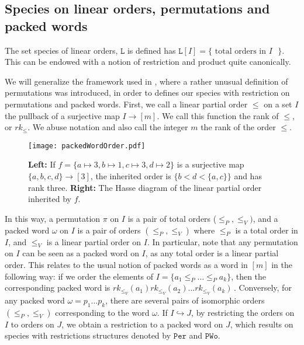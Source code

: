 \documentclass[submission]{FPSAC2023}
\theoremstyle{definition}
\begin{document}
\subsection{Species on linear orders, permutations and packed words\label{sec:speciespermutation}}

The set species of linear orders, $\mathtt{L}$ is defined has $\mathtt{L}[I] = \{\text{ total orders in $I$ }\}$.
This can be endowed with a notion of restriction and product quite canonically.

We will generalize the framework used in \cite{albert2020two}, where a rather unusual definition of permutations was introduced, in order to defines our species with restriction on permutations and packed words.  
First, we call a linear partial order $\leq$ on a set $I$ the pullback of a surjective map $I \to [m]$.
We call this function the rank of $\leq$, or $rk_{\leq}$.
We abuse notation and also call the integer $m$ the rank of the order $\leq$.

\begin{figure}[h]
	\centering
	\texttt{[image: packedWordOrder.pdf]}
	\caption{\textbf{Left:} If $f = \{ a\mapsto 3, b\mapsto 1, c\mapsto 3, d\mapsto 2\}$ is a surjective map $\{a, b, c, d\}\to[3]$, the inherited order is $\{b < d < \{a, c \}\}$ and has rank three. \textbf{Right:} The Hasse diagram of the linear partial order inherited by $f$. \label{fig:packedWordOrder}}
\end{figure}

In this way, a permutation $\pi$ on $I$ is a pair of total orders ($\leq_P, \leq_V)$, and a packed word $\omega$ on $I$ is a pair of orders $(\leq_P, \leq_V)$ where $\leq_P$ is a total order in $I$, and $\leq_V$ is a linear partial order on $I$.
In particular, note that any permutation on $I$ can be seen as a packed word on $I$, as any total order is a linear partial order.
This relates to the usual notion of packed words as a word in $[m]$ in the following way:
if we order the elements of $I = \{a_1 \leq_P \dots \leq_P a_k \}$, then the corresponding packed word is $rk_{\leq_V}(a_1)rk_{\leq_V}(a_2) \dots rk_{\leq_V}(a_k) \, $. Conversely, for any packed word $\omega = p_1\dots p_k$, there are several pairs of isomorphic orders $(\leq_P, \leq_V)$ corresponding to the word $\omega$. If $I \hookrightarrow J$, by restricting the orders on $I$ to orders on $J$, we obtain a restriction to a packed word on $J$, which results on species with restrictions structures denoted by $\mathtt{Per}$ and $\mathtt{PWo}$.
\end{document}

